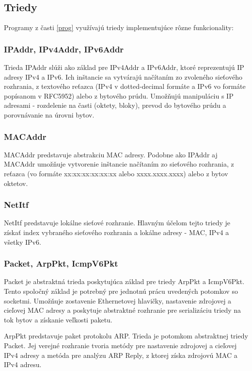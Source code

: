 \documentclass[a4paper,11pt]{article}
\begin{document}
\subsection{Triedy}
Programy z časti \ref{prog} využívajú triedy implementujúce rôzne funkcionality:

\subsubsection{IPAddr, IPv4Addr, IPv6Addr}
Trieda IPAddr slúži ako základ pre IPv4Addr a IPv6Addr, ktoré reprezentujú IP adresy IPv4 a IPv6. Ich inštancie sa vytvárajú načítaním zo zvoleného sieťového rozhrania, z textového reťazca (IPv4 v dotted-decimal formáte a IPv6 vo formáte popísanom v RFC5952) alebo z bytového prúdu. Umožňujú manipuláciu s IP adresami - rozdelenie na časti (oktety, bloky), prevod do bytového prúdu a porovnávanie na úrovni bytov.

\subsubsection{MACAddr}
MACAddr predstavuje abstrakciu MAC adresy. Podobne ako IPAddr aj MACAddr umožňuje vytvorenie inštancie načítaním zo sieťového rozhrania, z reťazca (vo formáte xx:xx:xx:xx:xx:xx alebo xxxx.xxxx.xxxx) alebo z bytov oktetov. 

\subsubsection{NetItf}
NetItf predstavuje lokálne sieťové rozhranie. Hlavným účelom tejto triedy je získať index vybraného sieťového rozhrania a lokálne adresy - MAC, IPv4 a všetky IPv6.

\subsubsection{Packet, ArpPkt, IcmpV6Pkt}
Packet je abstraktná trieda poskytujúca základ pre triedy ArpPkt a IcmpV6Pkt. Tento spoločný základ je potrebný pre jednotnú prácu uvedených potomkov so socketmi. Umožňuje zostavenie Ethernetovej hlavičky, nastavenie zdrojovej a cieľovej MAC adresy a poskytuje abstraktné rozhranie pre serializáciu triedy na tok bytov a získanie veľkosti paketu.

ArpPkt predstavuje paket protokolu ARP. Trieda je potomkom abstraktnej triedy Packet. Jej verejné rozhranie tvoria metódy pre nastavenie zdrojovej a cieľovej IPv4 adresy a metóda pre analýzu ARP Reply, z ktorej získa zdrojovú MAC a IPv4 adresu. 
\end{document}
